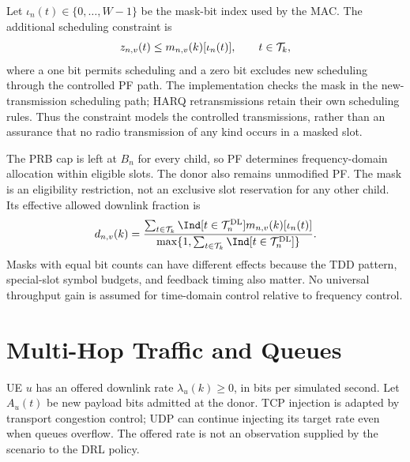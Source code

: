 \begin{EnChapter}
Let $\iota_n(t)\in\{0,\ldots,W-1\}$ be the mask-bit index used by the MAC.
The additional scheduling constraint is
\begin{equation}
  z_{n,v}(t)\le m_{n,v}(k)[\iota_n(t)],\qquad t\in\mathcal{T}_k,
  \label{eq:mask-constraint}
\end{equation}
where a one bit permits scheduling and a zero bit excludes new scheduling through
the controlled PF path. The implementation checks the mask in the new-transmission
scheduling path; HARQ retransmissions retain their own scheduling rules. Thus the
constraint models the controlled transmissions, rather than an assurance that no
radio transmission of any kind occurs in a masked slot.

The PRB cap is left at $B_n$ for every child, so PF determines frequency-domain
allocation within eligible slots. The donor also remains unmodified PF.
The mask is an eligibility restriction, not an exclusive slot reservation for
any other child. Its effective allowed downlink fraction is
\begin{equation}
  d_{n,v}(k)=
  \frac{\sum_{t\in\Tset_k}\Ind[t\in\Tset_n^{\mathrm{DL}}]
                          m_{n,v}(k)[\iota_n(t)]}
       {\max\{1,\sum_{t\in\Tset_k}\Ind[t\in\Tset_n^{\mathrm{DL}}]\}}.
  \label{eq:effective-mask}
\end{equation}
Masks with equal bit counts can have different effects because the TDD pattern,
special-slot symbol budgets, and feedback timing also matter. No universal
throughput gain is assumed for time-domain control relative to frequency control.

\section{Multi-Hop Traffic and Queues}
\label{subsec:traffic}

UE $u$ has an offered downlink rate $\lambda_u(k)\ge0$, in bits per simulated
second. Let $A_u(t)$ be new payload bits admitted at the donor. TCP injection is
adapted by transport congestion control; UDP can continue injecting its target
rate even when queues overflow. The offered rate is not an observation supplied
by the scenario to the DRL policy.


\end{EnChapter}

